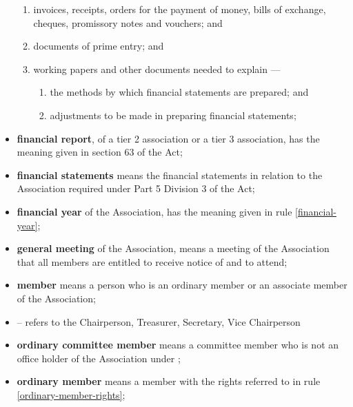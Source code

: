 \documentclass[../constitution.tex]{subfiles}
\begin{document}
\begin{itemize}[label={-}]
\begin{enumerate}
  \item invoices, receipts, orders for the payment of money, bills of exchange, cheques, promissory notes and vouchers; and
  \item documents of prime entry; and
  \item working papers and other documents needed to explain ---
    \begin{enumerate}
    \def\labelenumi{\roman{enumi})}
    \setcounter{enumi}{0}
    \item the methods by which financial statements are prepared; and
    \item adjustments to be made in preparing financial statements; 
    \end{enumerate}
  \end{enumerate}
\item \textbf{financial report}, of a tier 2 association or a tier 3 association, has the meaning given in section 63 of the Act;
\item \textbf{financial statements} means the financial statements in relation to the Association required under Part 5 Division 3 of the Act;
\item \textbf{financial year}\chadded[id=proofing]{,} of the Association, has the meaning given in rule \ref{financial-year};
\item \textbf{general meeting}\chadded[id=proofing]{,} of the Association, means a meeting of the Association that all members are entitled to receive notice of and to attend;
\item \textbf{member} means a person  who is an ordinary member or an associate member of the Association;
\item \textbf{} -- refers to the Chairperson, Treasurer, Secretary, Vice Chairperson 
\item \textbf{ordinary committee member} means a committee member who is not an office holder of the Association under ;
\item \textbf{ordinary member} means a member with the rights referred to in rule \ref{ordinary-member-rights};

\end{itemize}
\end{document}
